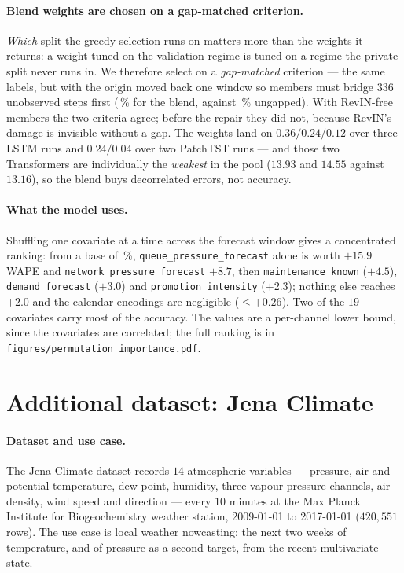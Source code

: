 \documentclass[10pt,twocolumn]{article}
\begin{document}
\paragraph{Blend weights are chosen on a gap-matched criterion.} \emph{Which} split
the greedy selection runs on matters more than the weights it returns: a weight
tuned on the validation regime is tuned on a regime the private split never runs
in. We therefore select on a \emph{gap-matched} criterion --- the same labels, but
with the origin moved back one window so members must bridge $336$ unobserved steps
first (\gapValWape\,\% for the blend, against \ensValWape\,\% ungapped). With
RevIN-free members the two criteria agree; before the repair they did not, because
RevIN's damage is invisible without a gap. The weights land on $0.36/0.24/0.12$ over
three LSTM runs and $0.24/0.04$ over two PatchTST runs --- and those two Transformers
are individually the \emph{weakest} in the pool ($13.93$ and $14.55$ against
$13.16$), so the blend buys decorrelated errors, not accuracy.

\paragraph{What the model uses.} Shuffling one covariate at a time across the
forecast window gives a concentrated ranking: from a base of \patchValWape\,\%,
\texttt{queue\_pressure\_forecast} alone is worth $+15.9$ WAPE and
\texttt{network\_pressure\_forecast} $+8.7$, then \texttt{maintenance\_known}
($+4.5$), \texttt{demand\_forecast} ($+3.0$) and \texttt{promotion\_intensity}
($+2.3$); nothing else reaches $+2.0$ and the calendar encodings are negligible
($\le +0.26$). Two of the $19$ covariates carry most of the accuracy. The values
are a per-channel lower bound, since the covariates are correlated; the full
ranking is in \texttt{figures/permutation\_importance.pdf}.

\section{Additional dataset: Jena Climate}
\label{sec:jena}

\paragraph{Dataset and use case.} The Jena Climate dataset \cite{jena2026} records
$14$ atmospheric variables --- pressure, air and potential temperature, dew point,
humidity, three vapour-pressure channels, air density, wind speed and direction ---
every $10$ minutes at the Max Planck Institute for Biogeochemistry weather station,
2009-01-01 to 2017-01-01 ($420{,}551$ rows). The use case is local weather
nowcasting: the next two weeks of temperature, and of pressure as a second target,
from the recent multivariate state.
\end{document}

